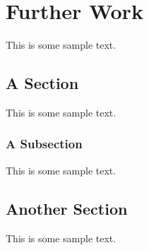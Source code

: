 \chapter{Further Work}

This is some sample text.

\section{A Section}

This is some sample text.

\subsection{A Subsection}

This is some sample text.

\section{Another Section}

This is some sample text.
